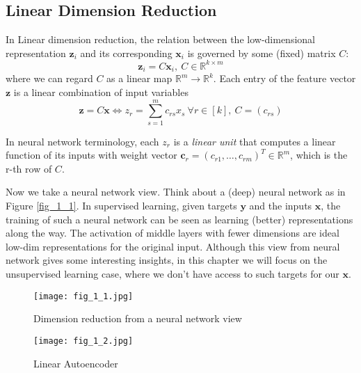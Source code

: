 \documentclass[../book-template.tex]{subfiles}
\begin{document}
\subsection{Linear Dimension Reduction}
In Linear dimension reduction, the relation between the low-dimensional representation $\bm{z}_i$ and its corresponding $\bm{x}_i$ is governed by some (fixed) matrix $C$:
\begin{equation*}
    \bm{z}_i = C\bm{x}_i,\ C\in\mathbb{R}^{k\times m}
\end{equation*}
where we can regard $C$ as a linear map $\mathbb{R}^m\rightarrow \mathbb{R}^k$. Each entry of the feature vector $\bm{z}$ is a linear combination of input variables
\begin{equation*}
    \bm{z} = C\bm{x} \Longleftrightarrow z_r = \sum_{s=1}^{m} c_{rs}x_s\ \forall r\in [k],\ C=(c_{rs})
\end{equation*}
\par In neural network terminology, each $z_r$ is a \emph{linear unit} that computes a linear function of its inputs with weight vector $\bm{c}_r = (c_{r1},\dots,c_{rm})^T\in \mathbb{R}^m$, which is the r-th row of $C$.
\par Now we take a neural network view. Think about a (deep) neural network as in Figure \ref{fig_1_1}. In supervised learning, given targets $\bm{y}$ and the inputs $\bm{x}$, the training of such a neural network can be seen as learning (better) representations along the way. The activation of middle layers with fewer dimensions are ideal low-dim representations for the original input. Although this view from neural network gives some interesting insights, in this chapter we will focus on the unsupervised learning case, where we don't have access to such targets for our $\bm{x}$.
\begin{figure}[h]
\centering
\begin{minipage}[t]{0.5\linewidth}
\centering
\texttt{[image: fig\_1\_1.jpg]}
\caption{Dimension reduction from a neural network view}\label{fig_1_1}
\end{minipage}
\begin{minipage}[t]{0.4\linewidth}       
\centering
\texttt{[image: fig\_1\_2.jpg]}
\caption{Linear Autoencoder}\label{fig_1_2}
\end{minipage}
\end{figure}
\end{document}
